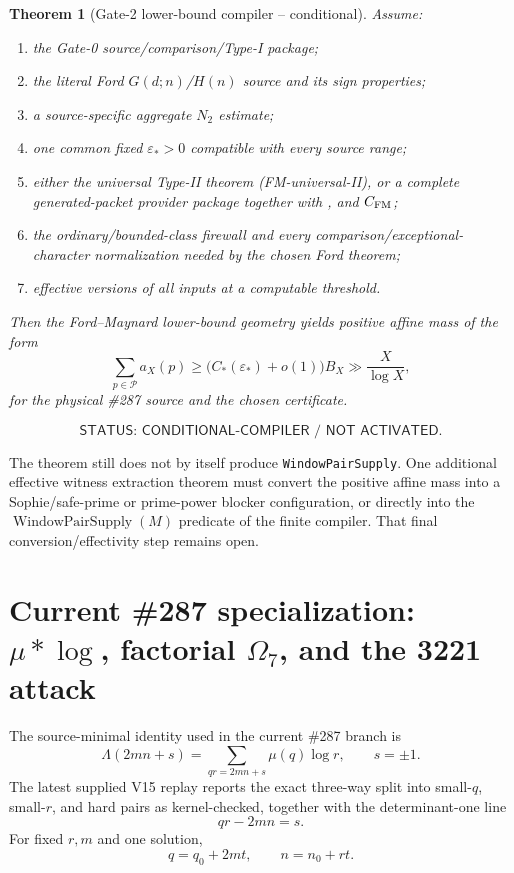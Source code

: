 \documentclass[11pt]{article}
\newtheorem{theorem}{Theorem}[section]
\theoremstyle{definition}
\newcommand{\1}{\mathbf 1}
\newcommand{\WPS}{\operatorname{WindowPairSupply}}
\newcommand{\status}[1]{\textsf{#1}}
\begin{document}
\begin{theorem}[Gate-2 lower-bound compiler -- conditional]
Assume:
\begin{enumerate}[label=\textup{G2.\arabic*},leftmargin=2.0em]
\item the Gate-0 source/comparison/Type-I package;
\item the literal Ford $G(d;n)$/$H(n)$ source and its sign properties;
\item a source-specific aggregate $N_2$ estimate;
\item one common fixed $\varepsilon_\ast>0$ compatible with every source range;
\item either the universal Type-II theorem (FM-universal-II), or a complete
generated-packet provider package together with
,
 and $C_{\rm FM}$;
\item the ordinary/bounded-class firewall and every comparison/exceptional-character
normalization needed by the chosen Ford theorem;
\item effective versions of all inputs at a computable threshold.
\end{enumerate}
Then the Ford--Maynard lower-bound geometry yields positive affine mass of the form
\[
\boxed{
\sum_{p\in\mathcal P}a_X(p)
\ge
\bigl(C_\ast(\varepsilon_\ast)+o(1)\bigr)B_X
\gg \frac{X}{\log X},
}
\tag{G2-positive}
\]
for the physical \#287 source and the chosen certificate.
\end{theorem}

\[
\status{STATUS: CONDITIONAL-COMPILER / NOT ACTIVATED.}
\]

The theorem still does not by itself produce \texttt{WindowPairSupply}.  One additional effective witness
extraction theorem must convert the positive affine mass into a Sophie/safe-prime or
prime-power blocker configuration, or directly into the $\WPS(M)$ predicate of the finite
compiler.  That final conversion/effectivity step remains open.

\section{Current \#287 specialization: $\mu*\log$, factorial $\Omega_7$, and the 3221 attack}
\label{sec:287-specialization-theory}

The source-minimal identity used in the current \#287 branch is
\[
\boxed{
\Lambda(2mn+s)
=
\sum_{qr=2mn+s}\mu(q)\log r,
\qquad s=\pm1.
}
\tag{287-mulog}
\]
The latest supplied V15 replay reports the exact three-way split into small-$q$,
small-$r$, and hard pairs as kernel-checked, together with the determinant-one line
\[
\boxed{qr-2mn=s.}
\]
For fixed $r,m$ and one solution,
\[
q=q_0+2mt,\qquad n=n_0+rt.
\]
\end{document}

